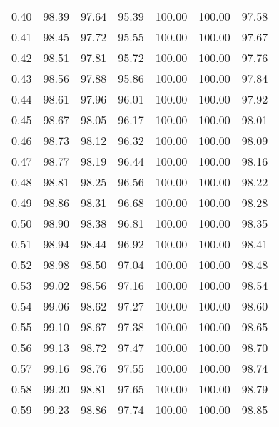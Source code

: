 \begin{tabular}{|c|c|c|c|c|c|c|}
      0.40 &     98.39 &     97.64 &      95.39 &  100.00 &     100.00 &         97.58 \\
      0.41 &     98.45 &     97.72 &      95.55 &  100.00 &     100.00 &         97.67 \\
      0.42 &     98.51 &     97.81 &      95.72 &  100.00 &     100.00 &         97.76 \\
      0.43 &     98.56 &     97.88 &      95.86 &  100.00 &     100.00 &         97.84 \\
      0.44 &     98.61 &     97.96 &      96.01 &  100.00 &     100.00 &         97.92 \\
      0.45 &     98.67 &     98.05 &      96.17 &  100.00 &     100.00 &         98.01 \\
      0.46 &     98.73 &     98.12 &      96.32 &  100.00 &     100.00 &         98.09 \\
      0.47 &     98.77 &     98.19 &      96.44 &  100.00 &     100.00 &         98.16 \\
      0.48 &     98.81 &     98.25 &      96.56 &  100.00 &     100.00 &         98.22 \\
      0.49 &     98.86 &     98.31 &      96.68 &  100.00 &     100.00 &         98.28 \\
      0.50 &     98.90 &     98.38 &      96.81 &  100.00 &     100.00 &         98.35 \\
      0.51 &     98.94 &     98.44 &      96.92 &  100.00 &     100.00 &         98.41 \\
      0.52 &     98.98 &     98.50 &      97.04 &  100.00 &     100.00 &         98.48 \\
      0.53 &     99.02 &     98.56 &      97.16 &  100.00 &     100.00 &         98.54 \\
      0.54 &     99.06 &     98.62 &      97.27 &  100.00 &     100.00 &         98.60 \\
      0.55 &     99.10 &     98.67 &      97.38 &  100.00 &     100.00 &         98.65 \\
      0.56 &     99.13 &     98.72 &      97.47 &  100.00 &     100.00 &         98.70 \\
      0.57 &     99.16 &     98.76 &      97.55 &  100.00 &     100.00 &         98.74 \\
      0.58 &     99.20 &     98.81 &      97.65 &  100.00 &     100.00 &         98.79 \\
      0.59 &     99.23 &     98.86 &      97.74 &  100.00 &     100.00 &         98.85 \\

\end{tabular}
